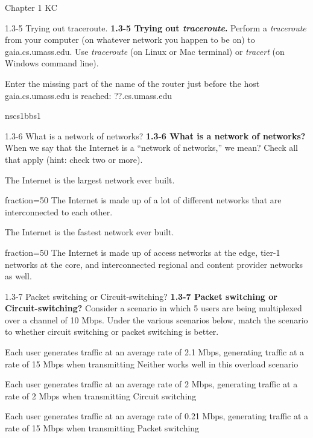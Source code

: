 \documentclass[a4paper]{article}
\begin{document}
\begin{quiz}{Chapter 1 KC}
\begin{shortanswer}[points=1,shuffle=true]{1.3-5 Trying out traceroute.}
\textbf{1.3-5 Trying out \textit{traceroute}.} 
Perform a \textit{traceroute} from your computer (on whatever network you happen to be on) to gaia.cs.umass.edu. Use \textit{traceroute} (on Linux or Mac terminal) or \textit{tracert} (on Windows command line). 

Enter the missing part of the name of the router just before the host gaia.cs.umass.edu is reached: ??.cs.umass.edu
\item nscs1bbs1
\end{shortanswer}

\begin{multi}[points=1,shuffle=true,multiple]{1.3-6 What is a network of networks?}
\textbf{1.3-6 What is a network of networks?}  
When we say that the Internet is a ``network of networks,'' we mean? Check all that apply (hint: check two or more).
\item The Internet is the largest network ever built.
\item[fraction=50] The Internet is made up of a lot of different networks that are interconnected to each other.
\item The Internet is the fastest network ever built.
\item[fraction=50] The Internet is made up of access networks at the edge, tier-1 networks at the core, and interconnected regional and content provider networks as well.
\end{multi}

\begin{matching}[points=1,shuffle=true]{1.3-7 Packet switching or Circuit-switching?}
\textbf{1.3-7 Packet switching or Circuit-switching?}
Consider a scenario in which 5 users are being multiplexed over a channel of 10 Mbps.  
Under the various scenarios below, match the scenario to whether circuit switching or packet switching is better.

\item Each user generates traffic at an average rate of 2.1 Mbps, generating traffic at a rate of 15 Mbps when transmitting \answer Neither works well in this overload scenario
\item Each user generates traffic at an average rate of 2 Mbps, generating traffic at a rate of 2 Mbps when transmitting \answer Circuit switching
\item Each user generates traffic at an average rate of 0.21 Mbps, generating traffic at a rate of 15 Mbps when transmitting \answer Packet switching
\end{matching}


\end{quiz}
\end{document}
